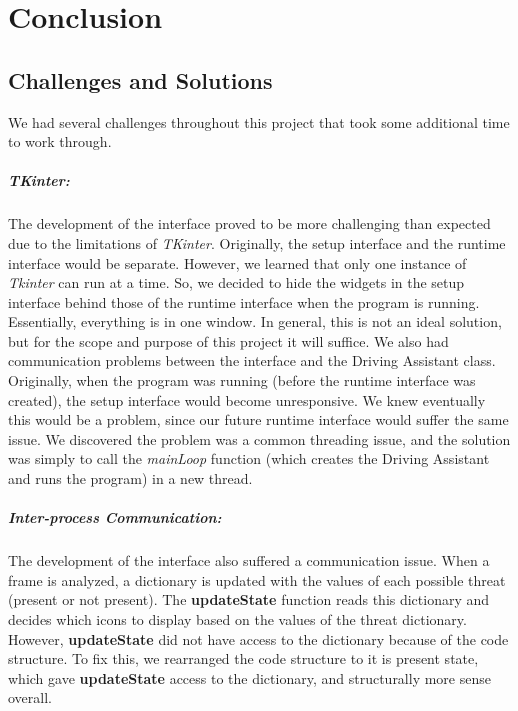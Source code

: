 \chapter{Conclusion}


\section{Challenges and Solutions}

We had several challenges throughout this project that took some additional time to work through.

\paragraph{TKinter:} The development of the interface proved to be more challenging than expected due to the limitations of \textit{TKinter}.  Originally, the setup interface and the runtime interface would be separate.  However, we learned that only one instance of \textit{Tkinter} can run at a time.  So, we decided to hide the widgets in the setup interface behind those of the runtime interface when the program is running.  Essentially, everything is in one window.  In general, this is not an ideal solution, but for the scope and purpose of this project it will suffice.  We also had communication problems between the interface and the Driving Assistant class.  Originally, when the program was running (before the runtime interface was created), the setup interface would become unresponsive.  We knew eventually this would be a problem, since our future runtime interface would suffer the same issue.  We discovered the problem was a common threading issue, and the solution was simply to call the \textit{mainLoop} function (which creates the Driving Assistant and runs the program) in a new thread.

\paragraph{Inter-process Communication:} The development of the interface also suffered a communication issue. When a frame is analyzed, a dictionary is updated with the values of each possible threat (present or not present).  The \textbf{updateState} function reads this dictionary and decides which icons to display based on the values of the threat dictionary.  However, \textbf{updateState} did not have access to the dictionary because of the code structure.  To fix this, we rearranged the code structure to it is present state, which gave \textbf{updateState} access to the dictionary, and structurally more sense overall.

